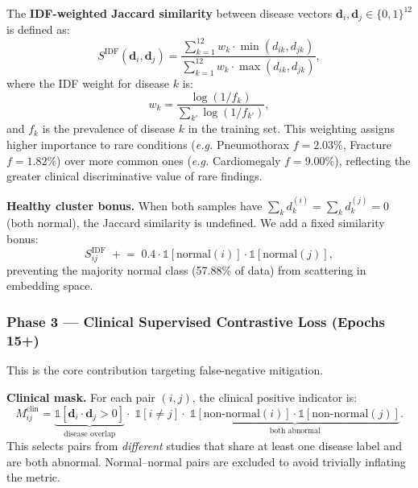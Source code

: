 \documentclass[11pt, a4paper]{article}
\newcommand{\vv}[1]{\mathbf{#1}}
\newcommand{\eg}{\textit{e.g.}}
\begin{document}
The \textbf{IDF-weighted Jaccard similarity} between disease vectors
$\vv{d}_i,\vv{d}_j\in\{0,1\}^{12}$ is defined as:
\begin{equation}
  \boxed{
  S^{\mathrm{IDF}}(\vv{d}_i,\vv{d}_j) =
    \frac{\displaystyle\sum_{k=1}^{12}w_k\cdot\min(d_{ik},d_{jk})}
         {\displaystyle\sum_{k=1}^{12}w_k\cdot\max(d_{ik},d_{jk})},
  }
  \label{eq:jaccard}
\end{equation}
where the IDF weight for disease $k$ is:
\begin{equation}
  w_k = \frac{\log(1/f_k)}{\sum_{k'}\log(1/f_{k'})},
  \label{eq:idf}
\end{equation}
and $f_k$ is the prevalence of disease $k$ in the training set.
This weighting assigns higher importance to rare conditions
(\eg{} Pneumothorax $f\!=\!2.03\%$, Fracture $f\!=\!1.82\%$) over
more common ones (\eg{} Cardiomegaly $f\!=\!9.00\%$), reflecting the
greater clinical discriminative value of rare findings.

\textbf{Healthy cluster bonus.}
When both samples have $\sum_k d_k^{(i)} = \sum_k d_k^{(j)} = 0$ (both
normal), the Jaccard similarity is undefined.
We add a fixed similarity bonus:
\begin{equation}
  S^{\mathrm{IDF}}_{ij} \;\mathrel{+}=\; 0.4\cdot
    \mathbb{1}[\mathrm{normal}(i)]\cdot\mathbb{1}[\mathrm{normal}(j)],
  \label{eq:normalbonus}
\end{equation}
preventing the majority normal class (57.88\% of data) from scattering
in embedding space.

\subsubsection{Phase 3 --- Clinical Supervised Contrastive Loss (Epochs 15+)}
\label{sec:clinical_loss}

This is the core contribution targeting false-negative mitigation.

\textbf{Clinical mask.} For each pair $(i,j)$, the clinical positive
indicator is:
\begin{equation}
  M^{\mathrm{clin}}_{ij} =
    \underbrace{\mathbb{1}[\vv{d}_i\cdot\vv{d}_j > 0]}_{\text{disease overlap}}
    \cdot\;
    \mathbb{1}[i\neq j]
    \cdot\;
    \underbrace{\mathbb{1}[\mathrm{non{\text{-}}normal}(i)]
    \cdot\mathbb{1}[\mathrm{non{\text{-}}normal}(j)]}_{\text{both abnormal}}.
  \label{eq:clinmask}
\end{equation}
This selects pairs from \emph{different} studies that share at least one
disease label and are both abnormal.
Normal--normal pairs are excluded to avoid trivially inflating the metric.
\end{document}
